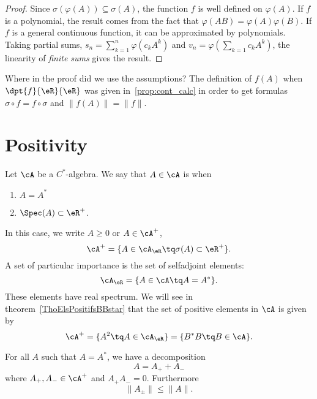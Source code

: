 \begin{proof}
	Since $\sigma(\varphi(A))\subseteq\sigma(A)$, the function $f$ is well defined on $\varphi(A)$. If $f$ is a polynomial, the result comes from the fact that $\varphi(AB)=\varphi(A)\varphi(B)$. If $f$ is a general continuous function, it can be approximated by polynomials. Taking partial sums, $s_n=\sum_{k=1}^n\varphi(c_kA^k)$ and $v_n=\varphi(\sum_{k=1}c_kA^k)$, the linearity of \emph{finite sums} gives the result.
\end{proof}

Where in the proof did we use the assumptions? The definition of $f(A)$ when $\dpt{f}{\eR}{\eR}$ was given in~\ref{prop:cont_calc} in order to get formulas $\sigma\circ f=f\circ\sigma$ and $\| f(A) \|=\| f \|$.

\section{Positivity}

Let $\cA$ be a $C^*$-algebra. We say that $A\in\cA$ is  when
\begin{enumerate}
	\item  $A=A^*$
	\item  $\Spec(A)\subset\eR^+$.
\end{enumerate}
In this case, we write $A\geq 0$ or $A\in\cA^+$,
\[
	\cA^+=\{ A\in\cA_{\eR}\tq\sigma(A)\subset\eR^+ \}.
\]
A set of particular importance is the set of selfadjoint elements:
\begin{equation}
	\cA_{\eR}=\{ A\in\cA\tq A=A^* \}.
\end{equation}
These elements have real spectrum. We will see in theorem~\ref{ThoElsPositifsBBstar} that the set of positive elements in $\cA$ is given by
\begin{equation}
	\cA^+=\{ A^2\tq A\in\cA_{\eR} \}=\{ B^*B\tq B\in\cA \}.
\end{equation}

\begin{lemma}
	For all $A$ such that $A=A^*$, we have a decomposition
	\[
		A=A_++A_-
	\]
	where $A_+,A_-\in\cA^+$ and $A_+A_-=0$. Furthermore
	\[
		\| A_{\pm} \|\leq \| A \|.
	\]
	\label{lem:AsAdecm}
\end{lemma}

